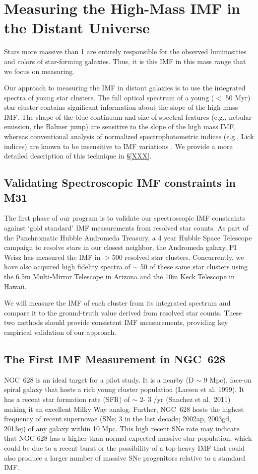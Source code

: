 \documentclass[11pt,preprint]{aastex}
\begin{document}
\section{Measuring the High-Mass IMF in the Distant Universe}

Stars more massive than 1 \msun are entirely responsible for the observed luminosities and colors of star-forming galaxies.  Thus, it is this IMF in this mass range that we focus on measuring.  

Our approach to measuring the IMF in distant galaxies is to use the integrated spectra of young star clusters. The full optical spectrum of a young ($<$ 50 Myr) star cluster contains significant information about the slope of the high mass IMF.  The shape of the blue continuum and size of spectral features (e.g., nebular emission, the Balmer jump) are sensitive to the slope of the high mass IMF, whereas conventional analysis of normalized spectrophotometric indices (e.g., Lick indices) are known to be insensitive to IMF variations \citep[e.g.,][]{kol08}.  We provide a more detailed description of this technique in \S \ref{XXX}.  

\subsection{Validating Spectroscopic IMF constraints in M31}

The first phase of our program is to validate our spectroscopic IMF constraints against `gold standard' IMF measurements from resolved star counts.  As part of the Panchromatic Hubble Andromeda Treasury, a 4 year Hubble Space Telescope campaign to resolve stars in our closest neighbor, the Andromeda galaxy, PI Weisz has measured the IMF in $>$500 resolved star clusters.  Concurrently, we have also acquired high fidelity spectra of $\sim$ 50 of these same star clusters using the 6.5m Multi-Mirror Telescope in Arizona and the 10m Keck Telescope in Hawaii.  

We will measure the IMF of each cluster from its integrated spectrum and compare it to the ground-truth value derived from resolved star counts.  These two methods should provide consistent IMF measurements, providing key empirical validation of our approach.


\subsection{The First IMF Measurement in NGC~628}

NGC~628 is an ideal target for a pilot study.  It is a nearby (D $\sim$ 9 Mpc), face-on spiral galaxy that hosts a rich young cluster population (Larsen et al. 1999). It has a recent star formation rate (SFR) of $\sim$ 2- 3 \msun /yr (Sanchez et al.\ 2011) making it an excellent Milky Way analog.  Further, NGC~628 hosts the highest frequency of recent supernovae (SNe; 3 in the last decade;  2002ap, 2003gd, 2013ej) of any galaxy within 10 Mpc.  This high recent SNe rate may indicate that NGC 628 has a higher than normal expected massive star population, which could be due to a recent burst or the possibility of a top-heavy IMF that could also produce a larger number of massive SNe progenitors relative to a standard IMF.
\end{document}
